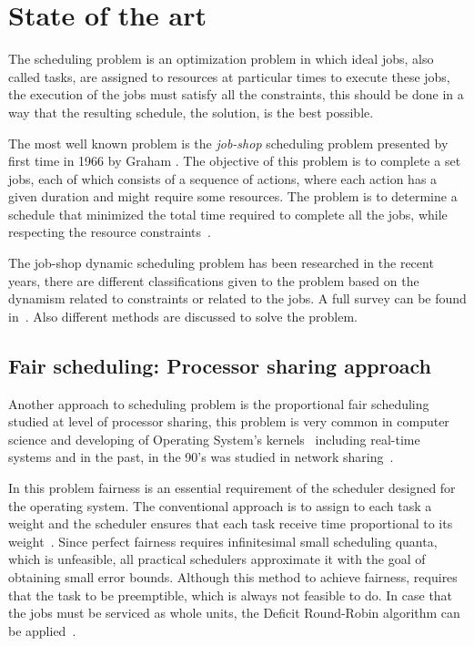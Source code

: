 \chapter{State of the art}

The scheduling problem is an optimization problem in which ideal jobs, also called tasks, are assigned to resources at particular times to execute these jobs, the execution of the jobs must satisfy all the constraints, this should be done in a way that the resulting schedule, the solution, is the best possible.

The most well known problem is the \textit{job-shop} scheduling problem presented by first time in 1966 by Graham \cite{graham66}. The objective of this problem is to complete a set jobs, each of which consists of a sequence of actions, where each action has a given duration and might require some resources. The problem is to determine a schedule that minimized the total time required to complete all the jobs, while respecting the resource constraints~\cite{russell03}.

The job-shop dynamic scheduling problem has been researched in the recent years, there are different classifications given to the problem based on the dynamism related to constraints or related to the jobs. A full survey can be found in~\cite{ouelhadj}. Also different methods are discussed to solve the problem.

\section{Fair scheduling: Processor sharing approach}

Another approach to scheduling problem is the proportional fair scheduling studied at level of processor sharing, this problem is very common in computer science and developing of Operating System's kernels~\cite{li09} including real-time systems and in the past, in the 90's was studied in network sharing~\cite{parekh93}. 

In this problem fairness is an essential requirement of the scheduler designed for the operating system. The conventional approach is to assign to each task a weight and the scheduler ensures that each task receive time proportional to its weight~\cite{katevenis91, parekh93}. Since perfect fairness requires infinitesimal small scheduling quanta, which is unfeasible, all practical schedulers approximate it with the goal of obtaining small error bounds. Although this method to achieve fairness, requires that the task to be preemptible, which is always not feasible to do. In case that the jobs must be serviced as whole units, the Deficit Round-Robin algorithm can be applied~\cite{shreedhar96}. 

